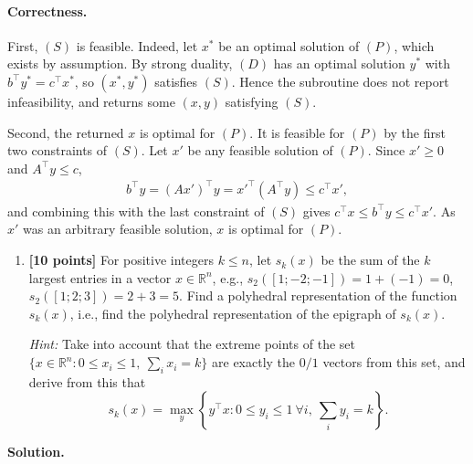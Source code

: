 \documentclass[11pt,letterpaper]{article}
\theoremstyle{definition}
\newcommand{\reals}{\mathbb{R}}
\newcommand{\solution}{\medskip\noindent\textbf{Solution.}\par\medskip}
\begin{document}
\paragraph{Correctness.}
First, $(S)$ is feasible.
Indeed, let $x^*$ be an optimal solution of $(P)$, which exists by assumption.
By strong duality, $(D)$ has an optimal solution $y^*$ with $b^\top y^* = c^\top x^*$, so $(x^*,y^*)$ satisfies $(S)$.
Hence the subroutine does not report infeasibility, and returns some $(x,y)$ satisfying $(S)$.

Second, the returned $x$ is optimal for $(P)$.
It is feasible for $(P)$ by the first two constraints of $(S)$.
Let $x'$ be any feasible solution of $(P)$.
Since $x'\geq 0$ and $A^\top y\leq c$,
\begin{align*}
    b^\top y = (Ax')^\top y = x'^\top(A^\top y)\leq c^\top x',
\end{align*}
and combining this with the last constraint of $(S)$ gives $c^\top x\leq b^\top y\leq c^\top x'$.
As $x'$ was an arbitrary feasible solution, $x$ is optimal for $(P)$.




\begin{enumerate}[resume=q]
\item \textbf{[10 points]} For positive integers $k \leq n$, let $s_k(x)$ be the sum of the $k$ largest entries in a vector $x \in \reals^n$, e.g., $s_2([1; -2; -1]) = 1 + (-1) = 0$, $s_2([1; 2; 3]) = 2 + 3 = 5$. Find a polyhedral representation of the function $s_k(x)$, i.e., find the polyhedral representation of the epigraph of $s_k(x)$.

\noindent \emph{Hint:} Take into account that the extreme points of the set $\{x \in \reals^n : 0 \leq x_i \leq 1, \ \sum_i x_i = k\}$ are exactly the $0/1$ vectors from this set, and derive from this that
\[
s_k(x) = \max_y \left\{ y^\top x : 0 \leq y_i \leq 1 \ \forall i, \ \sum_i y_i = k \right\}.
\]
\end{enumerate}

\solution
\end{document}
